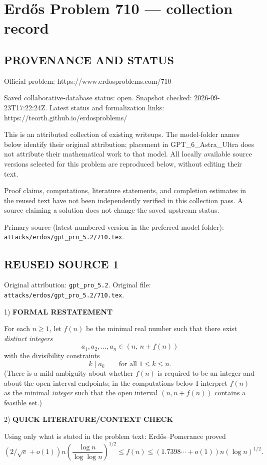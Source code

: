 \section*{Erd\H{o}s Problem 710 --- collection record}

\subsection*{PROVENANCE AND STATUS}
Official problem: https://www.erdosproblems.com/710

Saved collaborative-database status: open.
Snapshot checked: 2026-09-23T17:22:24Z.
Latest status and formalization links: https://teorth.github.io/erdosproblems/

This is an attributed collection of existing writeups. The model-folder names below identify their original attribution; placement in GPT\_6\_Astra\_Ultra does not attribute their mathematical work to that model. All locally available source versions selected for this problem are reproduced below, without editing their text.

Proof claims, computations, literature statements, and completion estimates in the reused text have not been independently verified in this collection pass. A source claiming a solution does not change the saved upstream status.

Primary source (latest numbered version in the preferred model folder): \texttt{attacks/erdos/gpt\_pro\_5.2/710.tex}.

\subsection*{REUSED SOURCE 1}
Original attribution: \texttt{gpt\_pro\_5.2}.
Original file: \texttt{attacks/erdos/gpt\_pro\_5.2/710.tex}.


1) \textbf{FORMAL RESTATEMENT}

For each $n\ge 1$, let $f(n)$ be the minimal real number such that there exist \emph{distinct integers}
\[
a_1,a_2,\dots,a_n\in (n,\,n+f(n))
\]
with the divisibility constraints
\[
 k\mid a_k\qquad\text{for all }1\le k\le n.
\]
(There is a mild ambiguity about whether $f(n)$ is required to be an integer and about the open interval endpoints; in the computations below I interpret $f(n)$ as the minimal \emph{integer} such that the open interval $(n,n+f(n))$ contains a feasible set.)

2) \textbf{QUICK LITERATURE/CONTEXT CHECK}

Using only what is stated in the problem text: Erd\H{o}s--Pomerance proved
\[
(2/\sqrt{e}+o(1))n\left(\frac{\log n}{\log\log n}\right)^{1/2}\le f(n)\le (1.7398\cdots+o(1))n(\log n)^{1/2}.
\]


